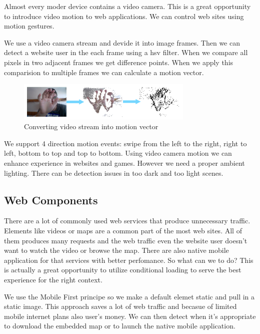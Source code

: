 \documentclass{iitsrc}
\begin{document}
Almost every moder device contains a video camera. This is a great opportunity to introduce video motion to web applications. We can control web sites using motion gestures.

We use a video camera stream and devide it into image frames. Then we can detect a website user in the each frame using a hsv filter. When we compare all pixels in two adjacent frames we get difference points. When we apply this comparision to multiple frames we can calculate a motion vector.

\begin{figure}[h]
    \begin{center}
        \includegraphics[width=0.75\textwidth]{../images/videomotion}
        \caption{Converting video stream into motion vector}
        \label{fig:videomotion}
    \end{center}
\end{figure}

We support 4 direction motion events: swipe from the left to the right, right to left, bottom to top and top to bottom. Using video camera motion we can enhance experience in websites and games. However we need a proper ambient lighting. There can be detection issues in too dark and too light scenes.




\subsection{Web Components} %
\label{sub:web_components}

There are a lot of commonly used web services that produce unnecessary traffic. Elements like videos or maps are a common part of the most web sites. All of them produces many requests and the web traffic even the website user doesn't want to watch the video or browse the map. There are also native mobile application for that services with better perfomance. So what can we to do? This is actually a great opportunity to utilize conditional loading to serve the best experience for the right context.

We use the Mobile First principe so we make a default elemet static and pull in a static image. This approach saves a lot of web traffic and becasue of limited mobile internet plans also user's money. We can then detect when it's appropriate to download the embedded map or to launch the native mobile application.
\end{document}
